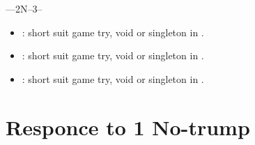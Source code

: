 \documentclass[12pt,twoside,a5paper]{report}%
\begin{document}
	----2N--3\cl{}--
	\begin{itemize}
	\renewcommand{\labelitemi}{}
	\item {} : short suit game try, void or singleton in \di{}.
	\item {} : short suit game try, void or singleton in \he{}.
	\item {} : short suit game try, void or singleton in \cl{}.
	\end{itemize}

\chapter*{Responce to 1 No-trump}
\end{document}

